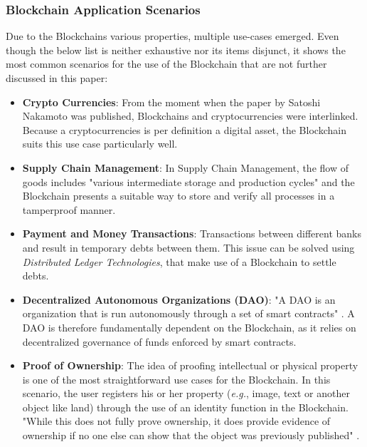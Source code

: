 \subsubsection{Blockchain Application Scenarios}
Due to the Blockchains various properties, multiple use-cases emerged. Even though the below list is neither exhaustive nor its items disjunct, it shows the most common scenarios for the use of the Blockchain \cite{Wust2017} that are not further discussed in this paper:
\begin{itemize}
  \item \textbf{Crypto Currencies}: From the moment when the paper by Satoshi Nakamoto \cite{Nakamoto2009} was published, Blockchains and cryptocurrencies were interlinked. Because a cryptocurrencies is per definition a digital asset, the Blockchain suits this use case particularly well.
  \item \textbf{Supply Chain Management}: In Supply Chain Management, the flow of goods includes "various intermediate storage and production cycles" \cite{Wust2017} and the Blockchain presents a suitable way to store and verify all processes in a tamperproof manner.
  \item \textbf{Payment and Money Transactions}: Transactions between different banks and result in temporary debts between them. This issue can be solved using \textit{Distributed Ledger Technologies}, that make use of a Blockchain to settle debts.
  \item \textbf{Decentralized Autonomous Organizations (DAO)}: "A DAO is an organization that is run autonomously through a set of smart contracts" \cite{Wust2017}. A DAO is therefore fundamentally dependent on the Blockchain, as it relies on decentralized governance of funds enforced by smart contracts.
  \item \textbf{Proof of Ownership}: The idea of proofing intellectual or physical property is one of the most straightforward use cases for the Blockchain. In this scenario, the user registers his or her property (\textit{e.g.}, image, text or another object like land) through the use of an identity function in the Blockchain. "While this does not fully prove ownership, it does provide evidence of ownership if no one else can show that the object was previously published" \cite{Wust2017}.
\end{itemize}

